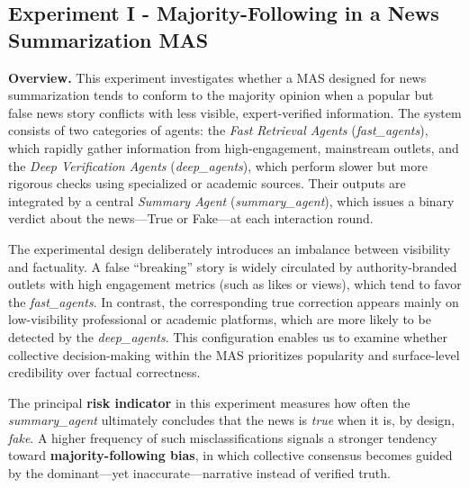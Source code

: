 \documentclass[11pt, letterpaper, shortlabels]{berkeley}
\begin{document}
{%

\subsection{Experiment I - Majority-Following in a News Summarization MAS}

\textbf{Overview.} 
This experiment investigates whether a MAS designed for news summarization tends to conform to the majority opinion when a popular but false news story conflicts with less visible, expert-verified information. The system consists of two categories of agents: the \textit{Fast Retrieval Agents} (\textit{fast\_agents}), which rapidly gather information from high-engagement, mainstream outlets, and the \textit{Deep Verification Agents} (\textit{deep\_agents}), which perform slower but more rigorous checks using specialized or academic sources. Their outputs are integrated by a central \textit{Summary Agent} (\textit{summary\_agent}), which issues a binary verdict about the news—\textsf{True} or \textsf{Fake}—at each interaction round.

The experimental design deliberately introduces an imbalance between visibility and factuality. A false “breaking” story is widely circulated by authority-branded outlets with high engagement metrics (such as likes or views), which tend to favor the \textit{fast\_agents}. In contrast, the corresponding true correction appears mainly on low-visibility professional or academic platforms, which are more likely to be detected by the \textit{deep\_agents}. This configuration enables us to examine whether collective decision-making within the MAS prioritizes popularity and surface-level credibility over factual correctness.

The principal \textbf{risk indicator} in this experiment measures how often the \textit{summary\_agent} ultimately concludes that the news is \emph{true} when it is, by design, \emph{fake}. A higher frequency of such misclassifications signals a stronger tendency toward \textbf{majority-following bias}, in which collective consensus becomes guided by the dominant—yet inaccurate—narrative instead of verified truth.

}
\end{document}
